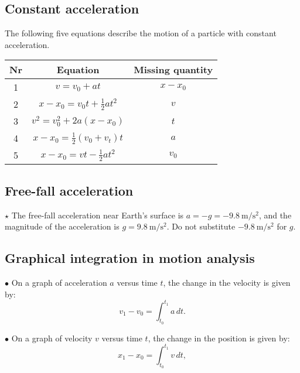 \subsection{Constant acceleration}
The following five equations describe the motion of a particle with constant acceleration.
\begin{table*}[h]
    \centering
    \begin{tabular}{|c|c|c|}
    \hline
    Nr & Equation & Missing quantity \\ \hline
    1 & $v = v_0 + at$ & $x - x_0$  \\ \hline
    2 & $x - x_0 = v_0 t + \frac{1}{2} at^2$ & $v$ \\ \hline
    3 & $v^2 = v^2_0 + 2a(x-x_0)$ & $t$ \\ \hline
    4 & $x-x_0 = \frac{1}{2}(v_0+v_t)t$ & $a$ \\ \hline
    5 & $x-x_0 = vt-\frac{1}{2}at^2$ & $v_0$ \\ \hline
    \end{tabular}    
\end{table*}

\subsection{Free-fall acceleration}
\noindent $\star$ The free-fall acceleration near Earth’s surface is $a = -g = -9.8~\mathrm{m/s^2}$, and the magnitude of the acceleration is $g = 9.8~\mathrm{m/s^2}$. Do not substitute $-9.8~\mathrm{m/s^2}$ for $g$.

\newpage

\subsection{Graphical integration in motion analysis}
\begin{multicols}{2}

\noindent $\bullet$ On a graph of acceleration $a$ versus time $t$, the change in the velocity is given by:
\[
v_1 - v_0 = \int_{t_0}^{t_1} a\, dt.
\]

\columnbreak

\noindent $\bullet$ On a graph of velocity $v$ versus time $t$, the change in the position is given by:
\[
x_1 - x_0 = \int_{t_0}^{t_1} v\, dt,
\]
\end{multicols}